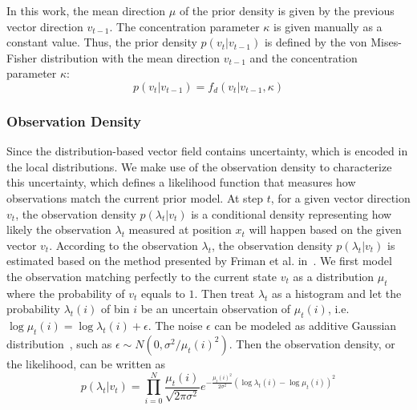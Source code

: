 In this work, the mean direction $\mu$ of the prior density is given by the previous vector direction ${v_{t - 1}}$. The concentration parameter $\kappa$ is given manually as a constant value. Thus, the prior density $p({v_t}|{v_{t - 1}})$ is defined by the von Mises-Fisher distribution with the mean direction ${v_{t - 1}}$ and the concentration parameter $\kappa$:
\begin{equation}
  p({v_t}|{v_{t - 1}}) = {f_d}({v_t}|{v_{t - 1}}, \kappa)
\end{equation}

\subsubsection{Observation Density}

Since the distribution-based vector field contains uncertainty, which is encoded in the local distributions. We make use of the observation density to characterize this uncertainty, which defines a likelihood function that measures how observations match the current prior model. At step $t$, for a given vector direction $v_t$, the observation density $p({\lambda_t}|{v_t})$ is a conditional density representing how likely the observation $\lambda_t$ measured at position $x_t$ will happen based on the given vector $v_t$. According to the observation $\lambda_t$, the observation density $p({\lambda_t}|{v_t})$ is estimated based on the method presented by Friman et al. in~\cite{frimanTMI06}. We first model the observation matching perfectly to the current state $v_t$ as a distribution $\mu_t$ where the probability of $v_t$ equals to $1$. Then treat $\lambda_t$ as a histogram and let the probability $\lambda_t(i)$ of bin $i$ be an uncertain observation of $\mu_t(i)$, i.e. $\log{\mu_t(i)}=\log{\lambda_t(i)}+\epsilon$. The noise $\epsilon$ can be modeled as additive Gaussian distribution~\cite{Basser1994,Salvador05}, such as $\epsilon \sim N(0,{\sigma ^2}/{\mu _t}{(i)^2})$. Then the observation density, or the likelihood, can be written as
\begin{equation}
  p({\lambda_t}|{v_t}) = \prod\limits_{i = 0}^N {\frac{{{\mu _t}(i)}}{{\sqrt {2\pi {\sigma ^2}} }}} {e^{ - \frac{{{\mu _t}{{(i)}^2}}}{{{2\sigma ^2}}}{{(\log{{\lambda _t}(i)} - \log{{\mu _t}(i)})}^2}}}
\end{equation}
